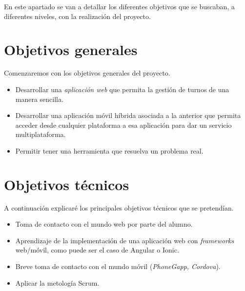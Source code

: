 
En este apartado se van a detallar los diferentes objetivos que se buscaban, a diferentes niveles, con la realización del proyecto.

\section{Objetivos generales}\label{objetivos-generales}
Comenzaremos con los objetivos generales del proyecto. 
\begin{itemize}
\tightlist
\item
  Desarrollar una  \emph{aplicación web} que permita la gestión de turnos de una manera sencilla. 
\item
  Desarrollar una aplicación móvil híbrida asociada a la anterior que permita acceder desde cualquier plataforma a esa aplicación para dar un servicio multiplataforma. 
\item
  Permitir tener una herramienta que resuelva un problema real.
\end{itemize}

\section{Objetivos técnicos}\label{objetivos-tecnicos}
A continuación explicaré los principales objetivos técnicos que se pretendían. 
\begin{itemize}
\tightlist
\item
  Toma de contacto con el mundo web por parte del alumno.
 \item
  Aprendizaje de la implementación de una aplicación web con \emph{frameworks} web/móvil, como puede ser el caso de Angular o Ionic. 
\item
  Breve toma de contacto con el mundo móvil (\emph{PhoneGapp, Cordova}).
\item
 Aplicar la metología Scrum.
\end{itemize}

